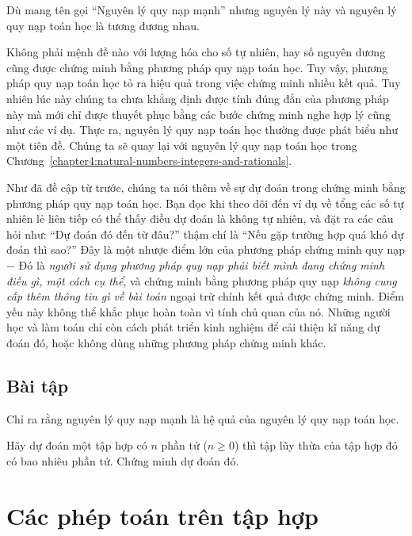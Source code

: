 Dù mang tên gọi ``Nguyên lý quy nạp mạnh'' nhưng nguyên lý này và nguyên lý quy nạp toán học là tương đương nhau.

Không phải mệnh đề nào với lượng hóa cho số tự nhiên, hay số nguyên dương cũng được chứng minh bằng phương pháp quy nạp toán học.  Tuy vậy, phương pháp quy nạp toán học tỏ ra hiệu quả trong việc chứng minh nhiều kết quả. Tuy nhiên lúc này chúng ta chưa khẳng định được tính đúng đắn của phương pháp này mà mới chỉ được thuyết phục bằng các bước chứng minh nghe hợp lý cũng như các ví dụ. Thực ra, nguyên lý quy nạp toán học thường được phát biểu như một tiên đề. Chúng ta sẽ quay lại với nguyên lý quy nạp toán học trong Chương~\ref{chapter4:natural-numbers-integers-and-rationals}.

Như đã đề cập từ trước, chúng ta nói thêm về sự dự đoán trong chứng minh bằng phương pháp quy nạp toán học. Bạn đọc khi theo dõi đến ví dụ về tổng các số tự nhiên lẻ liên tiếp có thể thấy điều dự đoán là không tự nhiên, và đặt ra các câu hỏi như: ``Dự đoán đó đến từ đâu?\@'' thậm chí là ``Nếu gặp trường hợp quá khó dự đoán thì sao?\@'' Đây là một nhược điểm lớn của phương pháp chứng minh quy nạp $-$ Đó là \textit{người sử dụng phương pháp quy nạp phải biết mình đang chứng minh điều gì, một cách cụ thể}, và chứng minh bằng phương pháp quy nạp \textit{không cung cấp thêm thông tin gì về bài toán} ngoại trừ chính kết quả được chứng minh. Điểm yếu này không thể khắc phục hoàn toàn vì tính chủ quan của nó. Những người học và làm toán chỉ còn cách phát triển kinh nghiệm để cải thiện kĩ năng dự đoán đó, hoặc không dùng những phương pháp chứng minh khác.

\subsection*{Bài tập}
\setcounter{exercise}{0}

\begin{exercise}
    Chỉ ra rằng nguyên lý quy nạp mạnh là hệ quả của nguyên lý quy nạp toán học.
\end{exercise}

\begin{exercise}
    Hãy dự đoán một tập hợp có $n$ phần tử ($n\geq 0$) thì tập lũy thừa của tập hợp đó có bao nhiêu phần tử. Chứng minh dự đoán đó.
\end{exercise}

\section{Các phép toán trên tập hợp}

